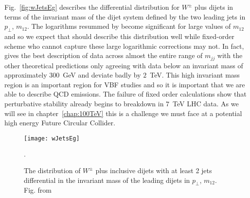 		Fig.~\eqref{fig:wJetsEg} describes the differential distribution for $W^\pm$ plus dijets in terms of the
		invariant mass of the dijet system defined by the two leading jets in $p_\perp$, $m_{12}$.  The logarithms
		resummed by \hej become significant for large values of $m_{12}$ and so we expect that \HEJ should
		describe this distribution well while fixed-order scheme who cannot capture these large logarithmic
		corrections may not. In fact, \HEJ gives the best description of data across almost the entire range of $m_{jj}$
		with the other theoretical predictions only agreeing with data below an invariant mass of approximately $300$~GeV
		and deviate badly by $2$~TeV.  This high invariant mass region is an important region for VBF studies and so it
		is important that we are able to describe QCD emissions.  The failure of fixed order calculations show that
		perturbative stability already begins to breakdown in $7$~TeV LHC data.  As we will see in chapter~\ref{chap:100TeV}
		this is a challenge we must face at a potential high energy Future Circular Collider.

		\begin{figure}[hbt]
			\centering
			\texttt{[image: wJetsEg]}
			\caption{The distribution of $W^\pm$ plus inclusive dijets with at least
			2 jets differential in the invariant mass of the leading dijets in $p_\perp$, $m_{12}$.
			Fig. from \cite{Aad:2014qxa}}.
			\label{fig:wJetsEg}
		\end{figure}

